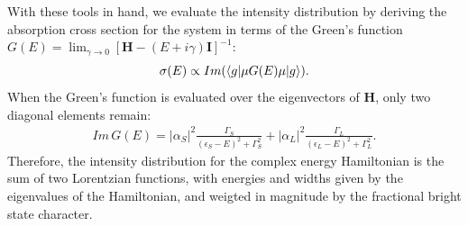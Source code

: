 \documentclass[12pt]{mitthesis}
\begin{document}
With these tools in hand, we evaluate the intensity distribution by
deriving the absorption cross section for the system in terms of the
Green's function $G(E) = \lim_{\gamma \rightarrow 0} \left [
  \mathbf{H} - (E+i \gamma) \mathbf{I} \right ]^{-1}$:
\begin{equation}
\sigma(E) \propto Im(\mathinner{\langle{g|\mu G(E) \mu|g}\rangle}).
\end{equation}
When the Green's function is evaluated over the eigenvectors of
$\mathbf{H}$, only two diagonal elements remain:
\begin{equation}
  \label{eq:greens-func}
  \begin{split}
    Im \, G(E) =
    \lvert \alpha_{S} \rvert^2
    \frac{\Gamma_{S}}
         {(\epsilon_{S} - E)^2 + \Gamma_{S}^2}
    + \lvert \alpha_{L} \rvert^2
    \frac{\Gamma_{L}}
         {(\epsilon_{L} - E)^2 + \Gamma_{L}^2}. 
  \end{split}
\end{equation}
Therefore, the intensity distribution for the complex energy
Hamiltonian is the sum of two Lorentzian functions, with energies and
widths given by the eigenvalues of the Hamiltonian, and weigted in
magnitude by the fractional bright state character.
\end{document}
